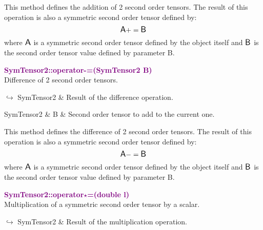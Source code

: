 This method defines the addition of 2 second order tensors.
The result of this operation is also a symmetric second order tensor defined by:
\begin{equation*}
\mbox{\large\ensuremath{\mathsf{A}}} += \mbox{\large\ensuremath{\mathsf{B}}}
\end{equation*}
where $\mbox{\large\ensuremath{\mathsf{A}}}$ is a symmetric second order tensor defined by the object itself and $\mbox{\large\ensuremath{\mathsf{B}}}$ is the second order tensor value defined by parameter B.

\textcolor{purple}{\textbf{SymTensor2::operator-=(SymTensor2 B)}}\label{SymTensor2::operator-=(SymTensor2 B)}\\
Difference of 2 second order tensors.\vspace*{-0.5em}
\begin{tcolorbox}[grow to left by=-1cm, width=\textwidth-1cm,myArgs,tabularx={l|R}]
$\hookrightarrow$ SymTensor2 & Result of the difference operation.
\end{tcolorbox}

\begin{tcolorbox}[width=\textwidth,myArgs,tabularx={ll|R}]
SymTensor2 & B & Second order tensor to add to the current one.
\end{tcolorbox}

This method defines the difference of 2 second order tensors.
The result of this operation is also a symmetric second order tensor defined by:
\begin{equation*}
\mbox{\large\ensuremath{\mathsf{A}}} -= \mbox{\large\ensuremath{\mathsf{B}}}
\end{equation*}
where $\mbox{\large\ensuremath{\mathsf{A}}}$ is a symmetric second order tensor defined by the object itself and $\mbox{\large\ensuremath{\mathsf{B}}}$ is the second order tensor value defined by parameter B.

\textcolor{purple}{\textbf{SymTensor2::operator$\star$=(double l)}}\label{SymTensor2::operator*=(double l)}\\
Multiplication of a symmetric second order tensor by a scalar.\vspace*{-0.5em}
\begin{tcolorbox}[grow to left by=-1cm, width=\textwidth-1cm,myArgs,tabularx={l|R}]
$\hookrightarrow$ SymTensor2 & Result of the multiplication operation.
\end{tcolorbox}

